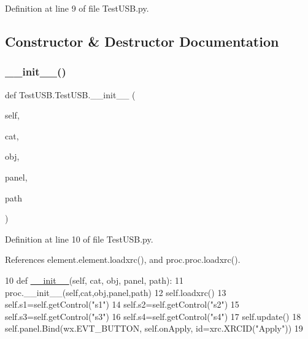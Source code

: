 Definition at line 9 of file Test\+U\+S\+B.\+py.



\subsection{Constructor \& Destructor Documentation}
\mbox{\label{classTestUSB_1_1TestUSB_a5b0c3f54b8c11fa9a0e02767bf409b6e}} 
\subsubsection{\texorpdfstring{\+\_\+\+\_\+init\+\_\+\+\_\+()}{\_\_init\_\_()}}
{\footnotesize\ttfamily def Test\+U\+S\+B.\+Test\+U\+S\+B.\+\_\+\+\_\+init\+\_\+\+\_\+ (\begin{DoxyParamCaption}\item[{}]{self,  }\item[{}]{cat,  }\item[{}]{obj,  }\item[{}]{panel,  }\item[{}]{path }\end{DoxyParamCaption})}



Definition at line 10 of file Test\+U\+S\+B.\+py.



References element.\+element.\+loadxrc(), and proc.\+proc.\+loadxrc().


\begin{DoxyCode}
10     \textcolor{keyword}{def }\hyperlink{classwrapper_1_1ModuleDictWrapper_a9a7a794150502f51df687831583e13b9}{\_\_init\_\_}(self, cat, obj, panel, path):
11         proc.\_\_init\_\_(self,cat,obj,panel,path)
12         self.loadxrc()
13         self.s1=self.getControl(\textcolor{stringliteral}{"s1"})
14         self.s2=self.getControl(\textcolor{stringliteral}{"s2"})
15         self.s3=self.getControl(\textcolor{stringliteral}{"s3"})
16         self.s4=self.getControl(\textcolor{stringliteral}{"s4"})
17         self.update()
18         self.panel.Bind(wx.EVT\_BUTTON, self.onApply, id=xrc.XRCID(\textcolor{stringliteral}{"Apply"}))
19 
\end{DoxyCode}


